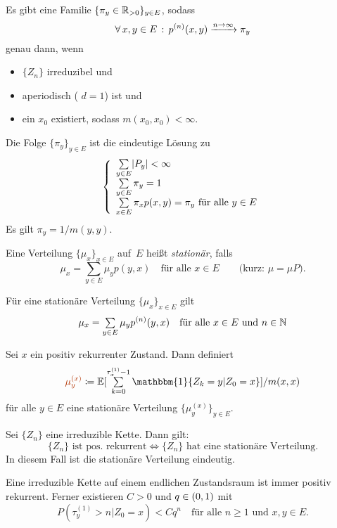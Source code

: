 \documentclass{cheat-sheet}
\newcommand{\E}{\mathbb{E}} %
\newcommand{\ind}{\mathbbm{1}} %
\newcommand{\Defn}[1]{\textcolor{DefinitionColor}{#1}}
\begin{document}
\begin{satz}
  Es gibt eine Familie $\{ \pi_y \in \mathbb{R}_{> 0} \}_{y \in E}$, sodass
  \[ \forall \, {x, y \in E} \,:\, p^{(n)}(x, y) \xrightarrow{n \to \infty} \pi_y \]
  genau dann, wenn
  \begin{itemize}
    \item $\{ Z_n \}$ irreduzibel und
    \item aperiodisch (\dh{} $d = 1$) ist und 
    \item ein $x_0$ existiert, sodass $m(x_0, x_0) < \infty$.
  \end{itemize}
  Die Folge $\{ \pi_y \}_{y \in E}$ ist die eindeutige Lösung zu
  \[
    \left\{
      \begin{array}{l}
        \sum_{y \in E} \abs{P_y} < \infty \\
        \sum_{y \in E} \pi_y = 1 \\
        \sum_{x \in E} \pi_x p(x, y) = \pi_y \text{ für alle } y \in E
      \end{array}
    \right.
  \]
  Es gilt $\pi_y = 1/m(y,y)$.
\end{satz}


\begin{defn}
  Eine Verteilung $\{ \mu_x \}_{x \in E}$ auf~$E$ heißt \emph{stationär}, falls
  \[
    \mu_x = \sum_{y \in E} \mu_y p(y, x)
    \quad \text{für alle $x \in E$}
    \qquad \text{(kurz: $\mu = \mu P$).}
  \]
\end{defn}

\begin{bem}
  Für eine stationäre Verteilung $\{ \mu_x \}_{x \in E}$ gilt
  \[
    \mu_x = \sum_{y \in E} \mu_y p^{(n)}(y, x)
    \quad \text{für alle $x \in E$ und $n \in \N$}
  \]
\end{bem}

\begin{lem}
  Sei $x$ ein positiv rekurrenter Zustand.
  Dann definiert
  \[
    \Defn{\mu_y^{(x)}} \coloneqq \E[ \sum_{k=0}^{\tau_x^{(1)} - 1} \ind \{ Z_k = y | Z_0 = x \} ] / m(x, x)
  \]
  für alle $y \in E$ eine stationäre Verteilung $\{ \mu_y^{(x)} \}_{y \in E}$.
\end{lem}

\begin{satz}
  Sei $\{ Z_n \}$ eine irreduzible Kette.
  Dann gilt:
  \[
    \{ Z_n \} \text{ ist pos. rekurrent} \iff
    \{ Z_n \} \text{ hat eine stationäre Verteilung.}
  \]
  In diesem Fall ist die stationäre Verteilung eindeutig.
\end{satz}


\begin{satz}
  Eine irreduzible Kette auf einem endlichen Zustandsraum ist immer positiv rekurrent.
  Ferner existieren $C > 0$ und $q \in \left( 0, 1 \right)$ mit
  \[
    P(\tau_y^{(1)} > n | Z_0 = x) < C q^n
    \quad \text{für alle $n \geq 1$ und $x, y \in E$.}
  \]
\end{satz}
\end{document}
